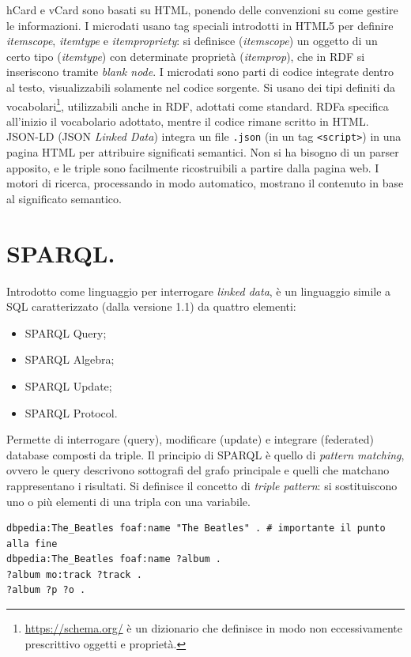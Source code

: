 \documentclass[11pt]{article}
\begin{document}
hCard e vCard sono basati su HTML, ponendo delle convenzioni su come gestire le informazioni. \newline
I microdati usano tag speciali introdotti in HTML5 per definire \textit{itemscope}, \textit{itemtype} e \textit{itempropriety}: si definisce (\textit{itemscope}) un oggetto di un certo tipo (\textit{itemtype}) con determinate proprietà (\textit{itemprop}), che in RDF si inseriscono tramite \textit{blank node}.
I microdati sono parti di codice integrate dentro al testo, visualizzabili solamente nel codice sorgente.
Si usano dei tipi definiti da vocabolari\footnote{\url{https://schema.org/} è un dizionario che definisce in modo non eccessivamente prescrittivo oggetti e proprietà.}, utilizzabili anche in RDF, adottati come standard. \newline
RDFa specifica all'inizio il vocabolario adottato, mentre il codice rimane scritto in HTML. \newline
JSON-LD (JSON \textit{Linked Data}) integra un file \verb|.json| (in un tag \verb|<script>|) in una pagina HTML per attribuire significati semantici.
Non si ha bisogno di un parser apposito, e le triple sono facilmente ricostruibili a partire dalla pagina web.
I motori di ricerca, processando in modo automatico, mostrano il contenuto in base al significato semantico.

\section{SPARQL.}
Introdotto come linguaggio per interrogare \textit{linked data}, è un linguaggio simile a SQL caratterizzato (dalla versione 1.1) da quattro elementi:
\begin{itemize}
  \item SPARQL Query;
  \item SPARQL Algebra;
  \item SPARQL Update;
  \item SPARQL Protocol.
\end{itemize}
Permette di interrogare (query), modificare (update) e integrare (federated) database composti da triple. Il principio di SPARQL è quello di \textit{pattern matching}, ovvero le query descrivono sottografi del grafo principale e quelli che matchano rappresentano i risultati.
Si definisce il concetto di \textit{triple pattern}: si sostituiscono uno o più elementi di una tripla con una variabile.
\begin{verbatim}
dbpedia:The_Beatles foaf:name "The Beatles" . # importante il punto alla fine
dbpedia:The_Beatles foaf:name ?album .
?album mo:track ?track .
?album ?p ?o .
\end{verbatim}
\end{document}
